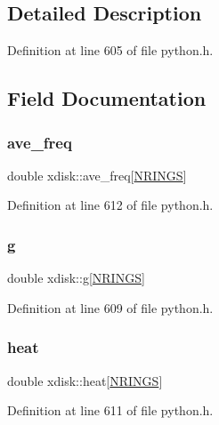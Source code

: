 \subsection{Detailed Description}


Definition at line 605 of file python.\+h.



\subsection{Field Documentation}
\mbox{\label{structxdisk_aba52b04695b1df389f04944f8a8d69cf}} 
\subsubsection{\texorpdfstring{ave\+\_\+freq}{ave\_freq}}
{\footnotesize\ttfamily double xdisk\+::ave\+\_\+freq\mbox{[}\hyperlink{python_8h_af8b02d1bed15b59f7062901b55c4d123}{N\+R\+I\+N\+GS}\mbox{]}}



Definition at line 612 of file python.\+h.

\mbox{\label{structxdisk_aab482a2209b216c79d450ff3adf103f3}} 
\subsubsection{\texorpdfstring{g}{g}}
{\footnotesize\ttfamily double xdisk\+::g\mbox{[}\hyperlink{python_8h_af8b02d1bed15b59f7062901b55c4d123}{N\+R\+I\+N\+GS}\mbox{]}}



Definition at line 609 of file python.\+h.

\mbox{\label{structxdisk_a34624d7a4f7db389afb745110b43a82c}} 
\subsubsection{\texorpdfstring{heat}{heat}}
{\footnotesize\ttfamily double xdisk\+::heat\mbox{[}\hyperlink{python_8h_af8b02d1bed15b59f7062901b55c4d123}{N\+R\+I\+N\+GS}\mbox{]}}



Definition at line 611 of file python.\+h.

